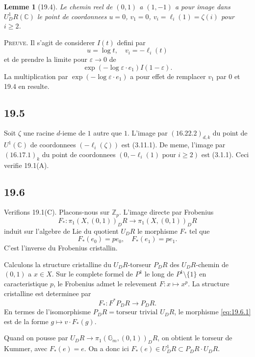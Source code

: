 \documentclass[12pt,a4paper]{article}
\theoremstyle{plain}
\newtheorem{lemma}[theorem]{Lemme}
\theoremstyle{definition}
\theoremstyle{remark}
\newcommand{\dR}{DR}
\newcommand{\Gm}{\mathbb{G}_m}
\newcommand{\ZZ}{\mathbb{Z}}
\newcommand{\CC}{\mathbb{C}}
\begin{document}
\begin{lemma}[19.4]\label{lem:19.4}
Le chemin reel de $(0,1)$ a $(1,-1)$ a pour image dans
$U^1_\dR(\CC)$ le point de coordonnees $u = 0$, $v_1 = 0$,
$v_i = \ell_i(1) = \zeta(i)$ pour $i \geq 2$.
\end{lemma}

\noindent \textsc{Preuve.} Il s'agit de considerer $I(t)$ defini par
\[
u = \log t, \quad v_i = -\ell_i(t)
\]
et de prendre la limite pour $\varepsilon \to 0$ de
\[
\exp(-\log \varepsilon \cdot e_1) I(1-\varepsilon).
\]
La multiplication par $\exp(-\log \varepsilon \cdot e_1)$ a pour effet
de remplacer $v_1$ par $0$ et 19.4 en resulte.

\subsection{19.5}

Soit $\zeta$ une racine $d$-ieme de $1$ autre que $1$. L'image par
$(16.22.2)_{d,k}$ du point de $U^1(\CC)$ de coordonnees
$(-\ell_i(\zeta))$ est (3.11.1). De meme, l'image par
$(16.17.1)_k$ du point de coordonnees $(0, -\ell_i(1) \text{ pour }
i \geq 2)$ est (3.1.1). Ceci verifie 19.1(A).

\subsection{19.6}

Verifions 19.1(C). Placons-nous sur $\ZZ_p$. L'image directe par
Frobenius
\[
F_* : \pi_1(X,(0,1))_\dR \to \pi_1(X,(0,1))_\dR
\]
induit sur l'algebre de Lie du quotient $U_\dR$ le morphisme $F_*$
tel que
\[
F_*(e_0) = p e_0, \quad F_*(e_1) = p e_1.
\]
C'est l'inverse du Frobenius cristallin.

Calculons la structure cristalline du $U_\dR$-torseur $P_\dR$ des
$U_\dR$-chemin de $(0,1)$ a $x \in X$. Sur le complete formel de
$P^1$ le long de $P^1 \setminus \{1\}$ en caracteristique $p$, le
Frobenius admet le relevement $F : x \mapsto x^p$. La structure
cristalline est determinee par
\begin{equation}\label{eq:19.6.1}
F_* : F^* P_\dR \to P_\dR.
\end{equation}
En termes de l'isomorphisme $P_\dR = \text{torseur trivial } U_\dR$,
le morphisme \eqref{eq:19.6.1} est de la forme $g \mapsto v \cdot F_*(g)$.

Quand on pousse par $U_\dR \to \pi_1(\Gm,(0,1))_\dR$, on obtient le
torseur de Kummer, avec $F_*(e) = e$. On a donc ici $F_*(e) \in
U^1_\dR \subset P_\dR \cdot U_\dR$.
\end{document}
